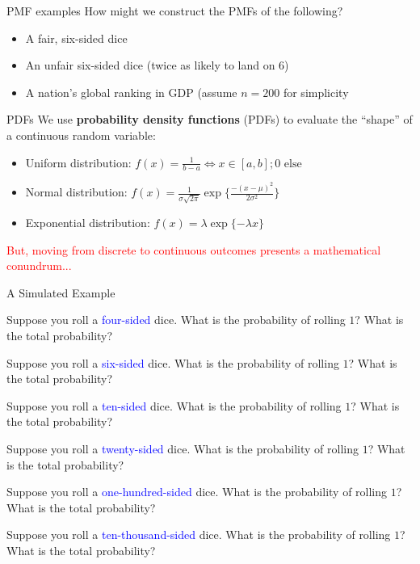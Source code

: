 \documentclass[10pt]{beamer}
\begin{document}
\begin{frame}{PMF examples}
    How might we construct the PMFs of the following?

    \begin{itemize}
        \item A fair, six-sided dice
        \item An unfair six-sided dice (twice as likely to land on 6)
        \item A nation's global ranking in GDP (assume $n = 200$ for simplicity
    \end{itemize}
\end{frame}

\begin{frame}{PDFs}
We use \textbf{probability density functions} (PDFs) to evaluate the ``shape'' of a continuous random variable:
\vspace{.5cm}
\begin{itemize}
    \item Uniform distribution: $f(x) = \frac{1}{b-a} \iff x \in [a,b]; 0 \text{ else}$ \pause
    \item Normal distribution: $f(x) = \frac{1}{\sigma \sqrt{2 \pi}}\exp\{\frac{-(x - \mu)^2}{2 \sigma^2}\}$ \pause
    \item Exponential distribution: $f(x) = \lambda \exp\{- \lambda x\}$
\end{itemize}

\textcolor{red}{But, moving from discrete to continuous outcomes presents a mathematical conundrum...}
\end{frame}


\begin{frame}{A Simulated Example}

Suppose you roll a \textcolor{blue}{four-sided} dice. What is the probability of rolling $1$? What is the total probability? \pause

Suppose you roll a \textcolor{blue}{six-sided} dice. What is the probability of rolling $1$? What is the total probability? \pause

Suppose you roll a \textcolor{blue}{ten-sided} dice. What is the probability of rolling $1$? What is the total probability? \pause 

Suppose you roll a \textcolor{blue}{twenty-sided} dice. What is the probability of rolling $1$? What is the total probability? \pause 

Suppose you roll a \textcolor{blue}{one-hundred-sided} dice. What is the probability of rolling $1$? What is the total probability? \pause

Suppose you roll a \textcolor{blue}{ten-thousand-sided} dice. What is the probability of rolling $1$? What is the total probability? \pause

\end{frame}
\end{document}
